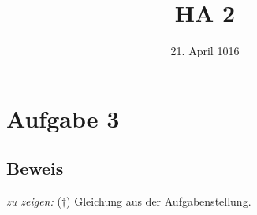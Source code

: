 



\title{HA 2}
\date{21. April 1016}

\maketitle

\section*{Aufgabe 3}

\subsection{Beweis}

\emph{zu zeigen:} ($\dagger$) Gleichung aus der Aufgabenstellung.

